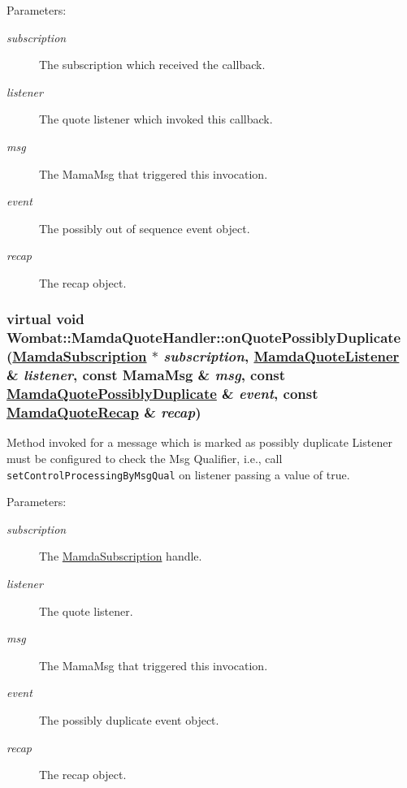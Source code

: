 \begin{Desc}
\item[Parameters:]
\begin{description}
\item[{\em subscription}]The subscription which received the callback. \item[{\em listener}]The quote listener which invoked this callback. \item[{\em msg}]The Mama\-Msg that triggered this invocation. \item[{\em event}]The possibly out of sequence event object. \item[{\em recap}]The recap object. \end{description}
\end{Desc}
\hypertarget{classWombat_1_1MamdaQuoteHandler_3882274ea1964f319cf831ccd058c7f3}{
\subsubsection[onQuotePossiblyDuplicate]{\setlength{\rightskip}{0pt plus 5cm}virtual void Wombat::Mamda\-Quote\-Handler::on\-Quote\-Possibly\-Duplicate (\hyperlink{classWombat_1_1MamdaSubscription}{Mamda\-Subscription} $\ast$ {\em subscription}, \hyperlink{classWombat_1_1MamdaQuoteListener}{Mamda\-Quote\-Listener} \& {\em listener}, const Mama\-Msg \& {\em msg}, const \hyperlink{classWombat_1_1MamdaQuotePossiblyDuplicate}{Mamda\-Quote\-Possibly\-Duplicate} \& {\em event}, const \hyperlink{classWombat_1_1MamdaQuoteRecap}{Mamda\-Quote\-Recap} \& {\em recap})}}
\label{classWombat_1_1MamdaQuoteHandler_3882274ea1964f319cf831ccd058c7f3}


Method invoked for a message which is marked as possibly duplicate Listener must be configured to check the Msg Qualifier, i.e., call {\tt set\-Control\-Processing\-By\-Msg\-Qual} on listener passing a value of true. 

\begin{Desc}
\item[Parameters:]
\begin{description}
\item[{\em subscription}]The \hyperlink{classWombat_1_1MamdaSubscription}{Mamda\-Subscription} handle. \item[{\em listener}]The quote listener. \item[{\em msg}]The Mama\-Msg that triggered this invocation. \item[{\em event}]The possibly duplicate event object. \item[{\em recap}]The recap object. \end{description}
\end{Desc}
